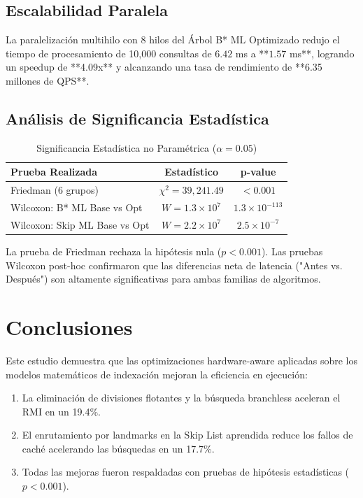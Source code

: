 \documentclass[twocolumn,10pt,journal]{IEEEtran}
\begin{document}
\subsection{Escalabilidad Paralela}
La paralelizaci\'on multihilo con 8 hilos del \'Arbol B* ML Optimizado redujo el tiempo de procesamiento de 10,000 consultas de $6.42$ ms a **$1.57$ ms**, logrando un speedup de **4.09x** y alcanzando una tasa de rendimiento de **6.35 millones de QPS**.

\subsection{An\'alisis de Significancia Estad\'istica}

\begin{table}[h]
\centering
\caption{Significancia Estad\'istica no Param\'etrica ($\alpha = 0.05$)}
\label{tab:stats}
\begin{tabular}{lcc}
\toprule
\textbf{Prueba Realizada} & \textbf{Estad\'istico} & \textbf{p-value} \\
\midrule
Friedman (6 grupos) & $\chi^2 = 39{,}241.49$ & $< 0.001$ \\
Wilcoxon: B* ML Base vs Opt & $W = 1.3 \times 10^7$ & $1.3 \times 10^{-113}$ \\
Wilcoxon: Skip ML Base vs Opt & $W = 2.2 \times 10^7$ & $2.5 \times 10^{-7}$ \\
\bottomrule
\end{tabular}
\end{table}

La prueba de Friedman rechaza la hip\'otesis nula ($p < 0.001$). Las pruebas Wilcoxon post-hoc confirmaron que las diferencias neta de latencia ("Antes vs. Despu\'es") son altamente significativas para ambas familias de algoritmos.

\section{Conclusiones}

Este estudio demuestra que las optimizaciones hardware-aware aplicadas sobre los modelos matem\'aticos de indexaci\'on mejoran la eficiencia en ejecuci\'on:
\begin{enumerate}
    \item La eliminaci\'on de divisiones flotantes y la b\'usqueda branchless aceleran el RMI en un 19.4\%.
    \item El enrutamiento por landmarks en la Skip List aprendida reduce los fallos de cach\'e acelerando las b\'usquedas en un 17.7\%.
    \item Todas las mejoras fueron respaldadas con pruebas de hip\'otesis estad\'isticas ($p < 0.001$).
\end{enumerate}



\end{document}
